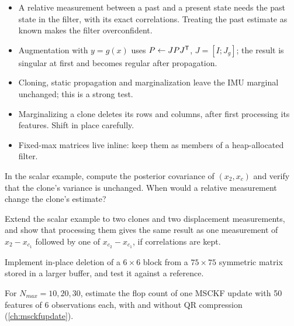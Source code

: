 \begin{takeaways}
\begin{itemize}
  \item A relative measurement between a past and a present state needs the past state in the filter, with its exact
        correlations. Treating the past estimate as known makes the filter overconfident.
  \item Augmentation with $y = g(x)$ uses $P \gets JPJ^{\mathsf{T}}$, $J = [I; J_g]$; the result is singular at first and becomes regular
        after propagation.
  \item Cloning, static propagation and marginalization leave the IMU marginal unchanged; this is a strong test.
  \item Marginalizing a clone deletes its rows and columns, after first processing its features. Shift in place carefully.
  \item Fixed-max matrices live inline: keep them as members of a heap-allocated filter.
\end{itemize}
\end{takeaways}

\begin{exercises}
  \item In the scalar example, compute the posterior covariance of $(x_2, x_c)$ and verify that the clone's variance is
        unchanged. When would a relative measurement change the clone's estimate?
  \item Extend the scalar example to two clones and two displacement measurements, and show that processing them gives the
        same result as one measurement of $x_2 - x_{c_1}$ followed by one of $x_{c_2} - x_{c_1}$, if correlations are kept.
  \item Implement in-place deletion of a $6\times6$ block from a $75\times75$ symmetric matrix stored in a larger buffer, and test it
        against a reference.
  \item For $N_{max} = 10, 20, 30$, estimate the flop count of one MSCKF update with 50 features of 6 observations each, with and
        without QR compression (\cref{ch:msckfupdate}).
\end{exercises}

